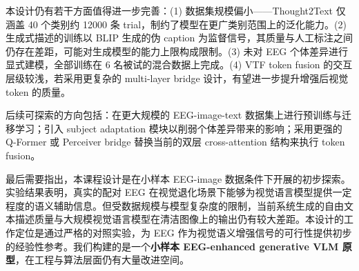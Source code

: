 本设计仍有若干方面值得进一步完善：(1) 数据集规模偏小——Thought2Text 仅涵盖 40 个类别约 12000 条 trial，制约了模型在更广类别范围上的泛化能力。(2) 生成式描述的训练以 BLIP 生成的伪 caption 为监督信号，其质量与人工标注之间仍存在差距，可能对生成模型的能力上限构成限制。(3) 未对 EEG 个体差异进行显式建模，全部训练在 6 名被试的混合数据上完成。(4) VTF token fusion 的交互层级较浅，若采用更复杂的 multi-layer bridge 设计，有望进一步提升增强后视觉 token 的质量。

后续可探索的方向包括：在更大规模的 EEG-image-text 数据集上进行预训练与迁移学习；引入 subject adaptation 模块以削弱个体差异带来的影响；采用更强的 Q-Former 或 Perceiver bridge 替换当前的双层 cross-attention 结构来执行 token fusion。

最后需要指出，本课程设计是在小样本 EEG-image 数据条件下开展的初步探索。实验结果表明，真实的配对 EEG 在视觉退化场景下能够为视觉语言模型提供一定程度的语义辅助信息。但受数据规模与模型复杂度的限制，当前系统生成的自由文本描述质量与大规模视觉语言模型在清洁图像上的输出仍有较大差距。本设计的工作定位是通过严格的对照实验，为 EEG 作为视觉语义增强信号的可行性提供初步的经验性参考。我们构建的是一个\textbf{小样本 EEG-enhanced generative VLM 原型}，在工程与算法层面仍有大量改进空间。